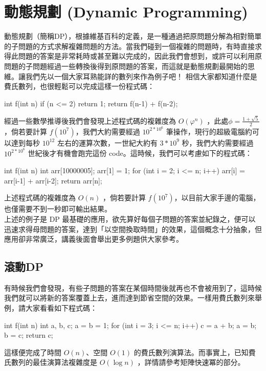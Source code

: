\section{動態規劃 (Dynamic Programming)}
動態規劃（簡稱DP），根據維基百科的定義，是一種通過把原問題分解為相對簡單的子問題的方式求解複雜問題的方法。當我們碰到一個複雜的問題時，有時直接求得此問題的答案是非常耗時或甚至難以完成的，因此我們會想到，或許可以利用原問題的子問題經過一些轉換後得到原問題的答案，而這就是動態規劃最開始的思維。讓我們先以一個大家耳熟能詳的數列來作為例子吧！
相信大家都知道什麼是費氏數列，也很輕鬆可以完成這樣一份程式碼：
\begin{C++}
	int f(int n) {
		if (n <= 2) return 1;
		return f(n-1) + f(n-2);
	}
\end{C++}
經過一些數學推導後我們會發現上述程式碼的複雜度為 $O(\varphi^n)$ ，此處$\phi = \frac{1 + \sqrt{5}}{2}$，倘若要計算 $f(10^7)$，我們大約需要經過 $10^{2 * 10^6}$ 筆操作，現行的超級電腦約可以達到每秒 $10^12$ 左右的運算次數，一世紀大約有 $3 * 10^9$ 秒，我們大約需要經過 $10^{2 * 10^6}$ 世紀後才有機會跑完這份 code。這時候，我們可以考慮如下的程式碼：
\begin{C++}
	int f(int n) {
		int arr[10000005];
		arr[1] = 1;
		for (int i = 2; i <= n; i++) {
			arr[i] = arr[i-1] + arr[i-2];
		}
		return arr[n];
	}
\end{C++}
上述程式碼的複雜度為 $O(n)$ ，倘若要計算 $f(10^7)$，以目前大家手邊的電腦，也僅需要不到一秒即可輸出結果。\\
上述的例子是 DP 最基礎的應用，欲先算好每個子問題的答案並紀錄之，便可以迅速求得母問題的答案，達到「以空間換取時間」的效果，這個概念十分抽象，但應用卻非常廣泛，講義後面會舉出更多例題供大家參考。

\subsection{滾動DP} 
有時候我們會發現，有些子問題的答案在某個時間後就再也不會被用到了，這時候我們就可以將新的答案覆蓋上去，進而達到節省空間的效果。一樣用費氏數列來舉例，請大家看看如下程式碼：
\begin{C++}
	int f(int n) {
		int a, b, c;
		a = b = 1;
		for (int i = 3; i <= n; i++) {
			c = a + b;
			a = b;
			b = c;
		}
		return c;
	}
\end{C++}
這樣便完成了時間 $O(n)$、空間 $O(1)$ 的費氏數列演算法。而事實上，已知費氏數列的最佳演算法複雜度是 $O(\log n)$ ，詳情請參考矩陣快速冪的部分。

